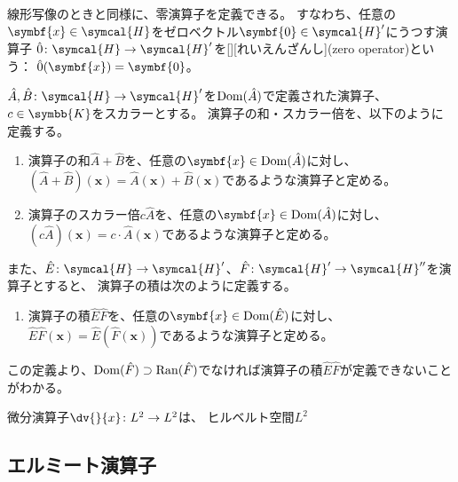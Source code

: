 \documentclass[../sotsu.tex]{subfiles}
\begin{document}
\par

線形写像のときと同様に、零演算子を定義できる。
すなわち、任意の$\symbf{x} \in \symcal{H}$をゼロベクトル$\symbf{0} \in \symcal{H}'$にうつす演算子
$\zeroop \colon \symcal{H} \to \symcal{H}'$を[][れいえんざんし](zero operator)という：
$\zeroop(\symbf{x}) = \symbf{0}$。

\begin{definition}
    \label{dfn:operator-sum-scalar}
    $\hat{A}, \hat{B} \colon \symcal{H} \to \symcal{H}'$を$\operatorname{Dom}(\hat{A})$で定義された演算子、
    $c \in \symbb{K}$をスカラーとする。
    演算子の和・スカラー倍を、以下のように定義する。
    \begin{enumerate}
        \item 演算子の和$\hat{A} + \hat{B}$を、任意の$\symbf{x} \in \domain(\hat{A})$に対し、
            $( \hat{A} + \hat{B} )(\symbf{x}) = \hat{A}(\symbf{x}) + \hat{B}(\symbf{x})$であるような演算子と定める。
        \item 演算子のスカラー倍$c\hat{A}$を、任意の$\symbf{x} \in \domain(\hat{A})$に対し、
            $( c\hat{A} )(\symbf{x}) = c \cdotp \hat{A}(\symbf{x})$であるような演算子と定める。
    \end{enumerate}
    また、$\hat{E} \colon \symcal{H} \to \symcal{H}'$、$\hat{F} \colon \symcal{H}' \to \symcal{H}''$を演算子とすると、
    演算子の積は次のように定義する。
    \begin{enumerate}[resume]
        \item 演算子の積$\hat{E} \hat{F}$を、任意の$\symbf{x} \in \domain(\hat{E})$に対し、
            $ \hat{E} \hat{F} (\symbf{x}) = \hat{E} ( \hat{F} (\symbf{x}) )$であるような演算子と定める。
    \end{enumerate}
    この定義より、$\operatorname{Dom}(\hat{F}) \supset \operatorname{Ran}(\hat{F})$でなければ演算子の積$\hat{E} \hat{F}$が定義できないことがわかる。
\end{definition}

微分演算子$\dv{}{x} \colon L^2 \to L^2$は、
ヒルベルト空間$L^2$




\subsection{エルミート演算子}
\end{document}
